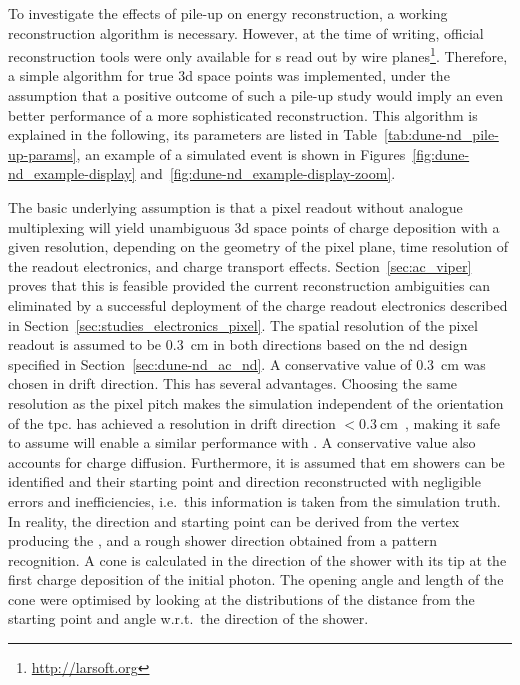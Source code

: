 To investigate the effects of pile-up on energy reconstruction, a working reconstruction algorithm is necessary.
However, at the time of writing, official reconstruction tools were only available for \lartpc{}s read out by wire planes\footnote{\url{http://larsoft.org}}.
Therefore, a simple algorithm for true \gls{3d} space points was implemented, under the assumption that a positive outcome of such a pile-up study would imply an even better performance of a more sophisticated reconstruction.
This algorithm is explained in the following, its parameters are listed in Table~\ref{tab:dune-nd_pile-up-params}, an example of a simulated event is shown in Figures~\ref{fig:dune-nd_example-display} and~\ref{fig:dune-nd_example-display-zoom}.

The basic underlying assumption is that a pixel readout without analogue multiplexing will yield unambiguous \gls{3d} space points of charge deposition with a given resolution, depending on the geometry of the pixel plane, time resolution of the readout electronics, and charge transport effects.
Section~\ref{sec:ac_viper} proves that this is feasible provided the current reconstruction ambiguities can eliminated by a successful deployment of the \larpix{} charge readout electronics described in Section~\ref{sec:studies_electronics_pixel}.
The spatial resolution of the pixel readout is assumed to be \SI{0.3}{\centi\metre} in both directions based on the \gls{nd} design specified in Section~\ref{sec:dune-nd_ac_nd}.
A conservative value of \SI{0.3}{\centi\meter} was chosen in drift direction.
This has several advantages.
Choosing the same resolution as the pixel pitch makes the simulation independent of the orientation of the \gls{tpc}.
\uboone{} has achieved a resolution in drift direction $< \SI{0.3}{\centi\metre}$~\cite{uboone}, making it safe to assume \larpix{} will enable a similar performance with \AC{}.
A conservative value also accounts for charge diffusion.
Furthermore, it is assumed that \gls{em} showers can be identified and their starting point and direction reconstructed with negligible errors and inefficiencies, i.e.\ this information is taken from the simulation truth.
In reality, the direction and starting point can be derived from the vertex producing the \Pgpz, and a rough shower direction obtained from a pattern recognition.
A cone is calculated in the direction of the shower with its tip at the first charge deposition of the initial photon.
The opening angle and length of the cone were optimised by looking at the distributions of the distance from the starting point and angle w.r.t.\ the direction of the shower.
